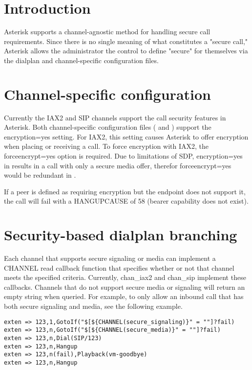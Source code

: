 \section{Introduction}
Asterisk supports a channel-agnostic method for handling secure call requirements. Since there is no single meaning of what constitutes a "secure call," Asterisk allows the administrator the control to define "secure" for themselves via the dialplan and channel-specific configuration files.

\section{Channel-specific configuration}
Currently the IAX2 and SIP channels support the call security features in Asterisk. Both channel-specific configuration files ( and ) support the encryption=yes setting. For IAX2, this setting causes Asterisk to offer encryption when placing or receiving a call. To force encryption with IAX2, the forceencrypt=yes option is required. Due to limitations of SDP, encryption=yes in  results in a call with only a secure media offer, therefor forceencrypt=yes would be redundant in .

If a peer is defined as requiring encryption but the endpoint does not support it, the call will fail with a HANGUPCAUSE of 58 (bearer capability does not exist).


\section{Security-based dialplan branching}
Each channel that supports secure signaling or media can implement a CHANNEL read callback function that specifies whether or not that channel meets the specified criteria. Currently, chan\_iax2 and chan\_sip implement these callbacks. Channels that do not support secure media or signaling will return an empty string when queried. For example, to only allow an inbound call that has both secure signaling and media, see the following example.

\begin{astlisting}
\begin{verbatim}
exten => 123,1,GotoIf("$[${CHANNEL(secure_signaling)}" = ""]?fail)
exten => 123,n,GotoIf("$[${CHANNEL(secure_media)}" = ""]?fail)
exten => 123,n,Dial(SIP/123)
exten => 123,n,Hangup
exten => 123,n(fail),Playback(vm-goodbye)
exten => 123,n,Hangup
\end{verbatim}
\end{astlisting}

